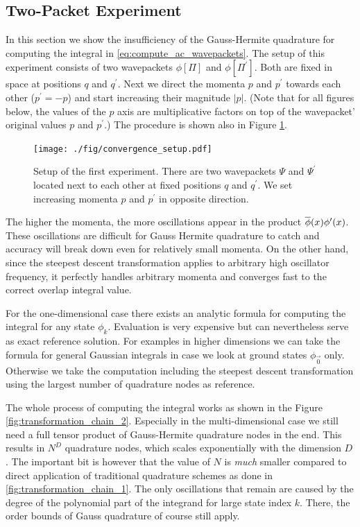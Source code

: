 \documentclass[a4paper,10pt]{article}
\begin{document}
\subsection{Two-Packet Experiment}


In this section we show the insufficiency of the Gauss-Hermite quadrature
for computing the integral in \eqref{eq:compute_ac_wavepackets}. The setup
of this experiment consists of two wavepackets $\phi[\Pi]$ and $\phi[\Pi^\prime]$.
Both are fixed in space at positions $q$ and $q^\prime$. Next we direct the
momenta $p$ and $p^\prime$ towards each other ($p^\prime = -p$) and start
increasing their magnitude $|p|$. (Note that for all figures below, the values
of the $p$ axis are multiplicative factors on top of the wavepacket' original
values $p$ and $p^\prime$.)
The procedure is shown also in Figure \ref{fig:convergence_setup}.

\begin{figure}[h!]
  \centering
  \texttt{[image: ./fig/convergence\_setup.pdf]}
  \caption{Setup of the first experiment. There are two wavepackets $\Psi$
    and $\Psi^\prime$ located next to each other at fixed positions $q$ and
    $q^\prime$. We set increasing momenta $p$ and $p^\prime$
    in opposite direction.}
  \label{fig:convergence_setup}
\end{figure}

The higher the momenta, the more oscillations appear in the product $\overline{\phi}(x) \phi^\prime(x)$.
These oscillations are difficult for Gauss Hermite quadrature to catch and accuracy
will break down even for relatively small momenta. On the other hand, since the
steepest descent transformation applies to arbitrary high oscillator frequency,
it perfectly handles arbitrary momenta and converges fast to the correct
overlap integral value.

For the one-dimensional case there exists an analytic formula for computing
the integral for any state $\phi_k$. Evaluation is very expensive but can nevertheless
serve as exact reference solution. For examples in higher dimensions we can take
the formula for general Gaussian integrals in case we look at ground states
$\phi_{\vec{0}}$ only. Otherwise we take the computation including the steepest
descent transformation using the largest number of quadrature nodes as reference.

The whole process of computing the integral works as shown in the Figure
\ref{fig:transformation_chain_2}. Especially in the multi-dimensional case
we still need a full tensor product of Gauss-Hermite quadrature nodes in the end.
This results in $N^D$ quadrature nodes, which scales exponentially with the
dimension $D$. The important bit is however that the value of $N$ is \emph{much}
smaller compared to direct application of traditional quadrature schemes as done
in \ref{fig:transformation_chain_1}.
The only oscillations that remain are caused by the degree of the polynomial part
of the integrand for large state index $k$. There, the order bounds of Gauss
quadrature of course still apply.
\end{document}
